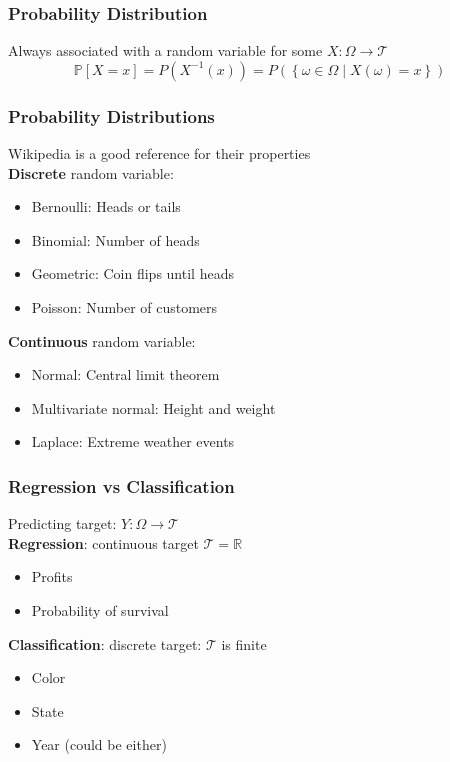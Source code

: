 \documentclass{beamer}
\newcommand{\Real}{\mathbb{R}}
\renewcommand{\P}[1]{\mathbb{P}\left[#1\right]}
\begin{document}
\begin{frame} \frametitle{Probability Distribution}
  Always associated with a random variable for some $X\colon \Omega \to \mathcal{T}$
  \[
    \P{X = x} = P\left(X^{-1}(x)\right) = P \left(  \left\{ \omega \in \Omega \mid X(\omega) = x  \right\} \right)
  \]
  \vspace{4cm}
\end{frame}

\begin{frame}
  \frametitle{Probability Distributions}
  {\small Wikipedia is a good reference for their properties}\\
  \vfill
  \textbf{Discrete} random variable:
    \begin{itemize}
    \item Bernoulli: Heads or tails
    \item Binomial: Number of heads
    \item Geometric: Coin flips until heads
    \item Poisson: Number of customers 
    \end{itemize}
    \vfill 
    \textbf{Continuous} random variable:
    \begin{itemize}
    \item Normal: Central limit theorem
    \item Multivariate normal: Height and weight
    \item Laplace: Extreme weather events
    \end{itemize}
\end{frame}

\begin{frame} \frametitle{Regression vs Classification}
  Predicting target: $Y : \Omega \to \mathcal{T}$ \\
  \vfill
    \textbf{Regression}: continuous target \(\mathcal{T} = \Real \)
    \begin{itemize}
    \item Profits
    \item Probability of survival
    \end{itemize}
     \vfill  
    \textbf{Classification}: discrete target: \(\mathcal{T}\) is finite
    \begin{itemize}
    \item Color 
    \item State
    \item Year (could be either)
    \end{itemize}
\end{frame}
\end{document}
